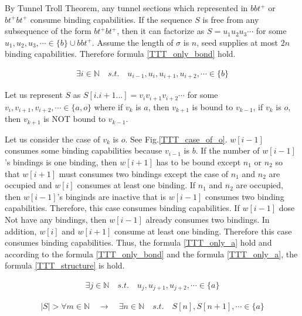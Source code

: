 \documentclass[runningheads]{llncs}
\begin{document}
By Tunnel Troll Theorem, any tunnel sections which represented in $bbt^+$ or $bt^+bt^+$ consume binding capabilities. If the sequence $S$ is free from any subsequence of the form $bt^+bt^+$, then it can factorize as $S = u_1 u_2 u_3 \cdots$ for some $u_1 , u_2 , u_3 , \cdots \in \{b\} \cup bbt^+$. Assume the length of $\sigma$ is $n$, seed supplies at most $2n$ binding capabilities. Therefore formula \ref{TTT_only_bond} hold.

\begin{eqnarray}
  \exists i \in \mathbb{N} \quad s.t. \quad u_{i-1} , u_i , u_{i+1} , u_{i+2} , \cdots \in \{ b \}
  \label{TTT_only_bond}
\end{eqnarray}


Let us represent $S$ as $S[i.i+1...] = v_i v_{i+1} v_{i+2} \cdots$ for some $v_i, v_{i+1}, v_{i+2}, \cdots \in \{ a, o\}$ where if $v_k$ is $a$, then $v_{k+1}$ is bound to $v_{k-1}$, if $v_k$ is $o$, then $v_{k+1}$ is NOT bound to $v_{k-1}$.


Let us consider the case of $v_k$ is $o$. See Fig.\ref{TTT_case_of_o}. $w[i-1]$ consumes some binding capabilities because $v_{i-1}$ is $b$. If the number of $w[i-1]$'s bindings is one binding, then $w[i+1]$ has to be bound except $n_1$ or $n_2$ so that $w[i+1]$ must consumes two bindings except the case of $n_1$ and $n_2$ are occupied and $w[i]$ consumes at least one binding. If $n_1$ and $n_2$ are occupied, then $w[i-1]$'s binginds are inactive that is $w[i-1]$ consumes two binding capabilities. Therefore, this case consumes binding capabilities. If $w[i-1]$ dose Not have any bindings, then $w[i-1]$ already consumes two bindings. In addition, $w[i]$ and $w[i+1]$ consume at least one binding. Therefore this case consumes binding capabilities. Thus, the formula \ref{TTT_only_a} hold and according to the formula \ref{TTT_only_bond} and the formula \ref{TTT_only_a}, the formula \ref{TTT_structure} is hold.

\begin{eqnarray}
  \exists j \in \mathbb{N} \quad s.t. \quad u_j , u_{j+1} , u_{j+2} , \cdots \in \{ a \}
  \label{TTT_only_a}
\end{eqnarray}

\begin{eqnarray}
  | S | > \forall m \in \mathbb{N} \quad \to \quad \exists n \in \mathbb{N} \quad s.t. \quad S[n], S[n+1], \cdots \in \{ a \}
  \label{TTT_structure}
\end{eqnarray}
\end{document}
